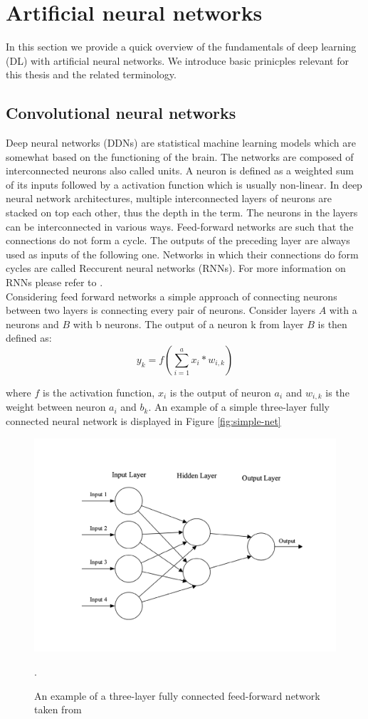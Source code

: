 \section{Artificial neural networks}
In this section we provide a quick overview of the fundamentals of deep learning (DL) with artificial neural networks. We introduce basic prinicples relevant for this thesis and the related terminology.

\subsection{Convolutional neural networks}
Deep neural networks (DDNs) are statistical machine learning models which are somewhat based on the functioning of the brain.
The networks are composed of interconnected neurons also called units.
A neuron is defined as a weighted sum of its inputs followed by a activation function which is usually non-linear.
In deep neural network architectures, multiple interconnected layers of neurons are stacked on top each other, thus the depth in the term.
The neurons in the layers can be interconnected in various ways.
Feed-forward networks are such that the connections do not form a cycle.
The outputs of the preceding layer are always used as inputs of the following one. 
Networks in which their connections do form cycles are called Reccurent neural networks (RNNs). 
For more information on RNNs please refer to \cite{reccurent-neural-networks}. \\

Considering feed forward networks a simple approach of connecting neurons between two layers is connecting every pair of neurons. 
Consider layers $A$ with a neurons and $B$ with b neurons.
The output of a neuron k from layer $B$ is then defined as:
\begin{equation}
    y_k=f(\sum_{i=1}^{a}x_i*w_{i,k})
\end{equation}

where $f$ is the activation function, $x_i$ is the output of neuron $a_i$ and $w_{i, k}$ is the weight between neuron $a_i$ and $b_k$. An example of a simple three-layer fully connected neural network is displayed in Figure \ref{fig:simple-net}
\begin{figure}[!htpb]
\centering
   \includegraphics[width=0.8\linewidth]{img/ch2/simple-net}
   \caption[Convolutional filter]{An example of a three-layer fully connected feed-forward network taken from \cite{conv-intro}}.
\end{figure}\label{fig:simple-net}


